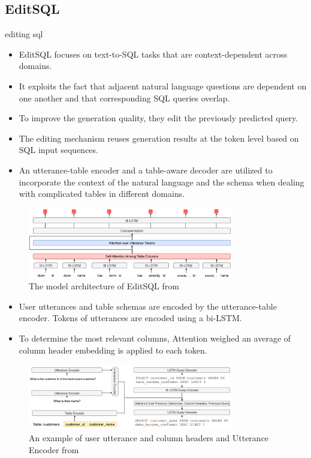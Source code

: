 \subsection{EditSQL}editing sql\cite{DBLP:journals/corr/abs-1909-00786}

\begin{itemize}
    \item EditSQL focuses on text-to-SQL tasks that are context-dependent across domains.
    \item It exploits the fact that adjacent natural language questions are dependent on one another and that corresponding SQL queries overlap.
    \item To improve the generation quality, they edit the previously predicted query.
    \item The editing mechanism reuses generation results at the token level based on SQL input sequences.
    \item An utterance-table encoder and a table-aware decoder are utilized to incorporate the context of the natural language and the schema when dealing with complicated tables in different domains.
\end{itemize}

\begin{figure}[htb]
    \centering
    \includegraphics[width=0.8\textwidth]{pics/EditSQL/Table.png}
    \caption{The model architecture of EditSQL from \cite{DBLP:journals/corr/abs-1909-00786}}
    \label{fig:EditSQL}
\end{figure}


\begin{itemize}
    \item User utterances and table schemas are encoded by the utterance-table encoder. Tokens of utterances are encoded using a bi-LSTM.
    \item To determine the most relevant columns, Attention weighed an average of column header embedding is applied to each token.
\end{itemize}

\begin{figure}[htb]
    \centering
    \includegraphics[width=0.8\textwidth]{pics/EditSQL/model.png}
    \caption{An example of user utterance and column headers and Utterance Encoder from \cite{DBLP:journals/corr/abs-1909-00786}}
    \label{fig:EditSQL_model}
\end{figure}

